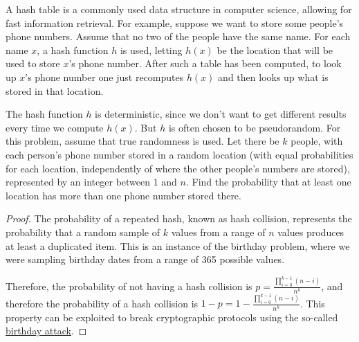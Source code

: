 \begin{exercise}{25}
A hash table is a commonly used data structure in computer science, allowing for fast
information retrieval. For example, suppose we want to store some people’s phone numbers. Assume that no two of the people have the same name. For each name $x$, a hash
function $h$ is used, letting $h(x)$ be the location that will be used to store $x$’s phone
number. After such a table has been computed, to look up $x$’s phone number one just
recomputes $h(x)$ and then looks up what is stored in that location.


The hash function $h$ is deterministic, since we don’t want to get different results every
time we compute $h(x)$. But $h$ is often chosen to be pseudorandom. For this problem,
assume that true randomness is used. Let there be $k$ people, with each person’s phone
number stored in a random location (with equal probabilities for each location, independently of where the other people’s numbers are stored), represented by an integer
between $1$ and $n$. Find the probability that at least one location has more than one
phone number stored there.
\end{exercise}

\begin{proof}
    The probability of a repeated hash, known as hash collision, represents the probability that a random sample of $k$ values from a range of $n$ values produces at least a duplicated item. This is an instance of the birthday problem, where we were sampling birthday dates from a range of 365 possible values.

    Therefore, the probability of not having a hash collision is $p = \frac{\prod_{i=0}^{k-1} (n-i)}{n^k}$, and therefore the probability of a hash collision is $1-p = 1 - \frac{\prod_{i=0}^{k-1} (n-i)}{n^k}$. This property can be exploited to break cryptographic protocols using the so-called \href{https://en.wikipedia.org/wiki/Birthday_attack}{birthday attack}.
\end{proof}

